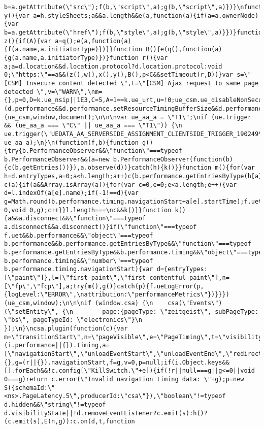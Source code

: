 \documentclass[
]{article}
\begin{document}
\begin{verbatim}
b=a.getAttribute(\"src\");f(b,\"script\",a);g(b,\"script\",a)})}\nfunction y(){var a=h.styleSheets;a&&a.length&&e(a,function(a){if(a=a.ownerNode){var b=a.getAttribute(\"href\");f(b,\"style\",a);g(b,\"style\",a)}})}function z(){if(A){var a=q();e(a,function(a){f(a.name,a.initiatorType)})}}function B(){e(q(),function(a){g(a.name,a.initiatorType)})}function r(){var a;a=d.location&&d.location.protocol?d.location.protocol:void 0;\"https:\"==a&&(z(),w(),x(),y(),B(),p<C&&setTimeout(r,D))}var s=\"[CSM] Insecure content detected \",t=\"[CSM] Ajax request to same page detected \",v=\"WARN\",\nm={},p=0,D=k.ue_nsip||1E3,C=5,A=1==k.ue_urt,u=!0;ue_csm.ue_disableNonSecure||(d.performance&&d.performance.setResourceTimingBufferSize&&d.performance.setResourceTimingBufferSize(300),r())})(ue_csm,window,document);\n\n\nvar ue_aa_a = \"T1\";\nif (ue.trigger && (ue_aa_a === \"C\" || ue_aa_a === \"T1\")) {\n    ue.trigger(\"UEDATA_AA_SERVERSIDE_ASSIGNMENT_CLIENTSIDE_TRIGGER_190249\", ue_aa_a);\n}\n(function(f,b){function g(){try{b.PerformanceObserver&&\"function\"===typeof b.PerformanceObserver&&(a=new b.PerformanceObserver(function(b){c(b.getEntries())}),a.observe(d))}catch(h){k()}}function m(){for(var h=d.entryTypes,a=0;a<h.length;a++)c(b.performance.getEntriesByType(h[a]))}function c(a){if(a&&Array.isArray(a)){for(var c=0,e=0;e<a.length;e++){var d=l.indexOf(a[e].name);if(-1!==d){var g=Math.round(b.performance.timing.navigationStart+a[e].startTime);f.uet(n[d],void 0,void 0,g);c++}}l.length===\nc&&k()}}function k(){a&&a.disconnect&&\"function\"===typeof a.disconnect&&a.disconnect()}if(\"function\"===typeof f.uet&&b.performance&&\"object\"===typeof b.performance&&b.performance.getEntriesByType&&\"function\"===typeof b.performance.getEntriesByType&&b.performance.timing&&\"object\"===typeof b.performance.timing&&\"number\"===typeof b.performance.timing.navigationStart){var d={entryTypes:[\"paint\"]},l=[\"first-paint\",\"first-contentful-paint\"],n=[\"fp\",\"fcp\"],a;try{m(),g()}catch(p){f.ueLogError(p,{logLevel:\"ERROR\",\nattribution:\"performanceMetrics\"})}}})(ue_csm,window);\n\n\nif (window.csa) {\n    csa(\"Events\")(\"setEntity\", {\n        page:{pageType: \"zeitgeist\", subPageType: \"bs\", pageTypeId: \"electronics\"}\n    });\n}\ncsa.plugin(function(c){var m=\"transitionStart\",n=\"pageVisible\",e=\"PageTiming\",t=\"visibilitychange\",s=\"$latency.visible\",i=c.global,r=(i.performance||{}).timing,a=[\"navigationStart\",\"unloadEventStart\",\"unloadEventEnd\",\"redirectStart\",\"redirectEnd\",\"fetchStart\",\"domainLookupStart\",\"domainLookupEnd\",\"connectStart\",\"connectEnd\",\"secureConnectionStart\",\"requestStart\",\"responseStart\",\"responseEnd\",\"domLoading\",\"domInteractive\",\"domContentLoadedEventStart\",\"domContentLoadedEventEnd\",\"domComplete\",\"loadEventStart\",\"loadEventEnd\"],o=i.Math,u=o.max,l=o.floor,d=i.document||{},g=(r||{}).navigationStart,f=g,v=0,p=null;if(i.Object.keys&&[].forEach&&!c.config[\"KillSwitch.\"+e]){if(!r||null===g||g<=0||void 0===g)return c.error(\"Invalid navigation timing data: \"+g);p=new S({schemaId:\"<ns>.PageLatency.5\",producerId:\"csa\"}),\"boolean\"!=typeof d.hidden&&\"string\"!=typeof d.visibilityState||!d.removeEventListener?c.emit(s):h()?(c.emit(s),E(n,g)):c.on(d,t,function 
\end{verbatim}
\end{document}
